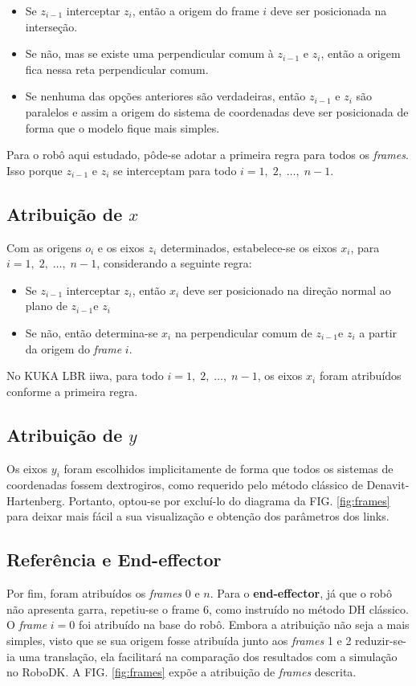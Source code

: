 \begin{itemize}
    \item Se $z_{i-1}$ interceptar $z_i$, então a origem do frame $i$ deve ser posicionada na interseção.
    \item Se não, mas se existe uma perpendicular comum à $z_{i-1}$ e $z_i$, então a origem fica nessa reta perpendicular comum. 
    \item Se nenhuma das opções anteriores são verdadeiras, então $z_{i-1}$ e $z_i$ são paralelos e assim a origem do sistema de coordenadas deve ser posicionada de forma que o modelo fique mais simples. 
\end{itemize}

Para o robô aqui estudado, pôde-se adotar a primeira regra para todos os \textit{frames}. Isso porque $z_{i-1}$ e $z_i$ se interceptam para todo $i=1,\;2,\;\dots,\;n-1$.

\subsection{Atribuição de \ensuremath{x}}
Com as origens $o_i$ e os eixos $z_i$ determinados, estabelece-se os eixos $x_i$, para $i=1,\;2,\;\dots,\;n-1$, considerando a seguinte regra:

\begin{itemize}
    \item Se $z_{i-1}$ interceptar $z_i$, então $x_i$ deve ser posicionado na direção normal ao plano de $z_{i-1}$e $z_i$
    \item Se não, então determina-se $x_i$ na perpendicular comum de $z_{i-1}$e $z_i$ a partir da origem do \textit{frame} $i$.  
\end{itemize}

No KUKA LBR iiwa, para todo $i=1,\;2,\;\dots,\;n-1$, os eixos $x_i$ foram atribuídos conforme a primeira regra.

\subsection{Atribuição de \ensuremath{y}}
Os eixos $y_i$ foram escolhidos implicitamente de forma que todos os sistemas de coordenadas fossem dextrogiros, como requerido pelo método clássico de Denavit-Hartenberg. Portanto, optou-se por excluí-lo do diagrama da FIG. \ref{fig:frames} para deixar mais fácil a sua visualização e obtenção dos parâmetros dos links.

\subsection{Referência e End-effector}
Por fim, foram atribuídos os \textit{frames} $0$ e $n$. Para o \textbf{end-effector}, já que o robô não apresenta garra, repetiu-se o frame $6$, como instruído no método DH clássico. O \textit{frame} $i=0$ foi atribuído na base do robô. Embora a atribuição não seja a mais simples, visto que se sua origem fosse atribuída junto aos \textit{frames} 1 e 2 reduzir-se-ia uma translação, ela facilitará na comparação dos resultados com a simulação no RoboDK. A FIG. \ref{fig:frames} expõe a atribuição de \textit{frames} descrita.


